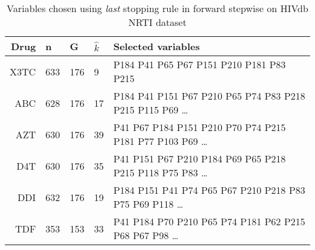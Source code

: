 \begin{table}[ht]
\centering
\begin{tabular}{rllll}
  \hline
Drug & n & G & $\hat k$ & Selected variables \\ 
  \hline
X3TC & 633 & 176 & 9 & P184 P41 P65 P67 P151 P210 P181 P83 P215 \\ 
ABC & 628 & 176 & 17 & P184 P41 P151 P67 P210 P65 P74 P83 P218 P215 P115 P69
\ldots  \\%
AZT & 630 & 176 & 39 & P41 P67 P184 P151 P210 P70 P74 P215 P181 P77
P103 P69 \ldots \\ %
D4T & 630 & 176 & 35 &P41 P151 P67 P210 P184 P69 P65 P218 P215 P118 P75 P83
\ldots \\ %
DDI & 632 & 176 & 19 & P184 P151 P41 P74 P65 P67 P210 P218 P83 P75 P69
P118
\ldots \\ %
TDF & 353 & 153 & 33 &P41 P184 P70 P210 P65 P74 P181 P62 P215 P68 P67 P98
\ldots \\ %
   \hline
\end{tabular}
\caption{Variables chosen using \textit{last} stopping rule in forward
  stepwise on HIVdb NRTI dataset} 
\label{tab:hivNRTI}
\end{table}

